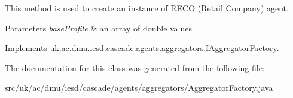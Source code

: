 This method is used to create an instance of {\ttfamily R\-E\-C\-O} (Retail Company) agent. 


\begin{DoxyParams}{Parameters}
{\em base\-Profile} & an array of double values \\
\hline
\end{DoxyParams}


Implements \hyperlink{interfaceuk_1_1ac_1_1dmu_1_1iesd_1_1cascade_1_1agents_1_1aggregators_1_1_i_aggregator_factory_a2bd1b763fcd470a8ba1e0a18b93c8161}{uk.\-ac.\-dmu.\-iesd.\-cascade.\-agents.\-aggregators.\-I\-Aggregator\-Factory}.



The documentation for this class was generated from the following file\-:\begin{DoxyCompactItemize}
\item 
src/uk/ac/dmu/iesd/cascade/agents/aggregators/Aggregator\-Factory.\-java\end{DoxyCompactItemize}
